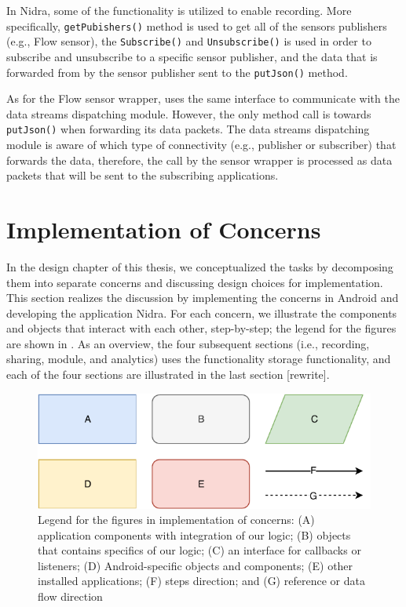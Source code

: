 In Nidra, some of the functionality is utilized to enable recording. More specifically, \verb|getPubishers()| method is used to get all of the sensors publishers (e.g., Flow sensor), the \verb|Subscribe()| and \verb|Unsubscribe()| is used in order to subscribe and unsubscribe to a specific sensor publisher, and the data that is forwarded from by the sensor publisher sent to the \verb|putJson()| method.

As for the Flow sensor wrapper, uses the same interface to communicate with the data streams dispatching module. However, the only method call is towards \verb|putJson()| when forwarding its data packets. The data streams dispatching module is aware of which type of connectivity (e.g., publisher or subscriber) that forwards the data, therefore, the call by the sensor wrapper is processed as data packets that will be sent to the subscribing applications. 

\section{Implementation of Concerns} \label{impl:ioc}
In the design chapter of this thesis, we conceptualized the tasks by decomposing them into separate concerns and discussing design choices for implementation. This section realizes the discussion by implementing the concerns in Android and developing the application Nidra. For each concern, we illustrate the components and objects that interact with each other, step-by-step; the legend for the figures are shown in . As an overview, the four subsequent sections (i.e., recording, sharing, module, and analytics) uses the functionality storage functionality, and each of the four sections are illustrated in the last section [rewrite].

\begin{figure}[!h]
    \centering
    \includegraphics[scale=0.7]{images/Legend.pdf}
    \caption{Legend for the figures in implementation of concerns: (A) application components with integration of our logic; (B) objects that contains specifics of our logic; (C) an interface for callbacks or listeners; (D) Android-specific objects and components; (E) other installed applications; (F) steps direction; and (G) reference or data flow direction}
    \label{fig:legend}
\end{figure}

